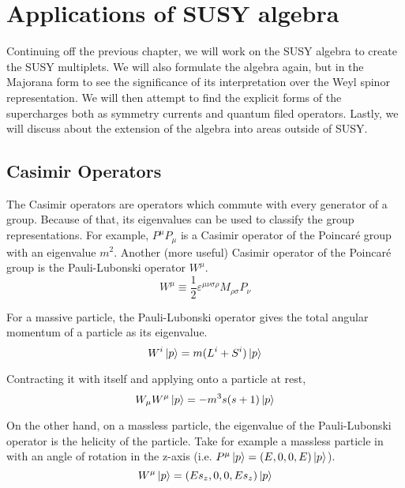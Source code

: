 \chapter{Applications of SUSY algebra}
\label{ch:7}
Continuing off the previous chapter, we will work on the SUSY algebra to create the SUSY multiplets. We will also formulate the algebra again, but in the Majorana form to see the significance of its interpretation over the Weyl spinor representation. We will then attempt to find the explicit forms of the supercharges both as symmetry currents and quantum filed operators. Lastly, we will discuss about the extension of the algebra into areas outside of SUSY.

\section{Casimir Operators}
\label{ch:7:casimir operator}
The Casimir operators are operators which commute with every generator of a group. Because of that, its eigenvalues can be used to classify the group representations. For example, $P^\mu P_\mu$ is a Casimir operator of the Poincar\'{e} group with an eigenvalue $m^2$. Another (more useful) Casimir operator of the Poincar\'{e} group is the Pauli-Lubonski operator $W^\mu$.
\begin{equation}
    W^\mu \equiv \frac{1}{2} \varepsilon^{\mu \nu \sigma \rho} M_{\rho\sigma} P_\nu
\end{equation}

For a massive particle, the Pauli-Lubonski operator gives the total angular momentum of a particle as its eigenvalue.
\begin{equation}
    W^i\ket{p} = m(L^i + S^i)\ket{p}
\end{equation}

Contracting it with itself and applying onto a particle at rest,
\begin{equation}
    W_\mu W^\mu \ket{p} = -m^3 s(s+1) \ket{p}
\end{equation}

On the other hand, on a massless particle, the eigenvalue of the Pauli-Lubonski operator is the helicity of the particle. Take for example a massless particle in with an angle of rotation in the z-axis (i.e. $P^\mu \ket{p} = (E, 0, 0, E) \ket{p}$).
\begin{equation}
    W^\mu \ket{p}  = (Es_z, 0, 0, Es_z) \ket{p}
\end{equation}

